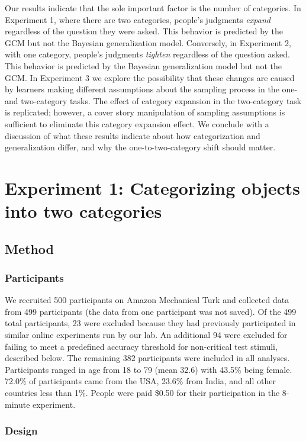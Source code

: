 \documentclass[doc,apacite]{apa6}
\begin{document}
Our results indicate that the sole important factor is the number of categories. In Experiment 1, where there are two categories, people's judgments {\it expand} regardless of the question they were asked. This behavior is predicted by the GCM but not the Bayesian generalization model. Conversely, in Experiment 2, with one category, people's judgments {\it tighten} regardless of the question asked. This behavior is predicted by the Bayesian generalization model but not the GCM. 
In Experiment 3 we explore the possibility that these changes are caused by learners making different assumptions about the sampling process in the one- and two-category tasks. The effect of category expansion in the two-category task is replicated; however, a cover story manipulation of sampling assumptions is sufficient to eliminate this category expansion effect.
We conclude with a discussion of what these results indicate about how categorization and generalization differ, and why the one-to-two-category shift should matter.

\section{Experiment 1: Categorizing objects into two categories}

\subsection{Method}

\subsubsection{Participants}

We recruited 500 participants on Amazon Mechanical Turk and collected data from 499 participants (the data from one participant was not saved). Of the 499 total participants, 
23 were excluded because they had previously participated in similar online experiments run by our lab. An additional 94 were excluded for failing to meet a predefined accuracy threshold for non-critical test stimuli, described below. The remaining 382 participants were included in all analyses. Participants ranged in age from 18 to 79 (mean 32.6) with 43.5\% being female. 72.0\% of participants came from the USA, 23.6\% from India, and all other countries less than 1\%. People were paid \$0.50 for their participation in the 8-minute experiment.

\subsubsection{Design}
\end{document}
